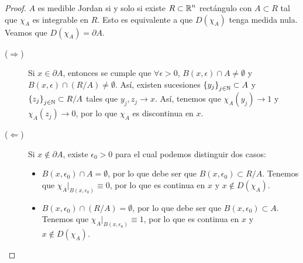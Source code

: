 \begin{proof}
$\displaystyle A $ es medible Jordan si y solo si existe $\displaystyle R \subset \mathbb{R}^{n} $ rectángulo con $\displaystyle A \subset R $ tal que $\displaystyle \chi_{A} $ es integrable en $\displaystyle R $. Esto es equivalente a que $\displaystyle D\left(\chi_{A}\right) $ tenga medida nula. Veamos que $\displaystyle D\left(\chi_{A}\right)=\partial A $.
\begin{description}
\item[($\displaystyle \Rightarrow$)] Si $\displaystyle x \in \partial A $, entonces se cumple que $\displaystyle \forall \epsilon > 0 $, $\displaystyle B\left(x,\epsilon \right)\cap A \neq \emptyset $ y $\displaystyle B\left(x,\epsilon \right)\cap \left(R/A\right) \neq \emptyset $. 
Así, existen sucesiones $\displaystyle \left\{ y_{j}\right\} _{j \in \mathbb{N}} \subset A $ y $\left\{ z_{j}\right\} _{j \in \mathbb{N}}\subset R/A $ tales que $\displaystyle y_{j},z_{j}\to x $. Así, tenemos que $\displaystyle \chi_{A}\left(y_{j}\right) \to 1 $ y $\displaystyle \chi_{A}\left(z_{j}\right)\to 0 $, por lo que $\displaystyle \chi_{A} $ es discontinua en $\displaystyle x $.
\item[($\displaystyle \Leftarrow $)] Si $\displaystyle x \not\in \partial A $, existe $\displaystyle \epsilon_{0} > 0 $ para el cual podemos distinguir dos casos:
	\begin{itemize}
	\item $\displaystyle B\left(x, \epsilon_{0}\right) \cap A = \emptyset $, por lo que debe ser que $\displaystyle B\left(x,\epsilon_{0}\right) \subset R/A $. Tenemos que $\displaystyle \chi_{A}|_{B\left(x, \epsilon_{0}\right)}\equiv 0 $, por lo que es continua en $\displaystyle x $ y $\displaystyle x \not\in D\left(\chi_{A}\right) $.
	\item $\displaystyle B\left(x, \epsilon _{0}\right)\cap \left(R/A\right)=\emptyset $, por lo que debe ser que $\displaystyle B\left(x, \epsilon_{0}\right)\subset A $. Tenemos que $\displaystyle \chi_{A}|_{B\left(x, \epsilon _{0}\right)} \equiv 1 $, por lo que es continua en $\displaystyle x $ y $\displaystyle x \not\in D\left(\chi_{A}\right) $.
	\end{itemize}
\end{description}
\end{proof}

